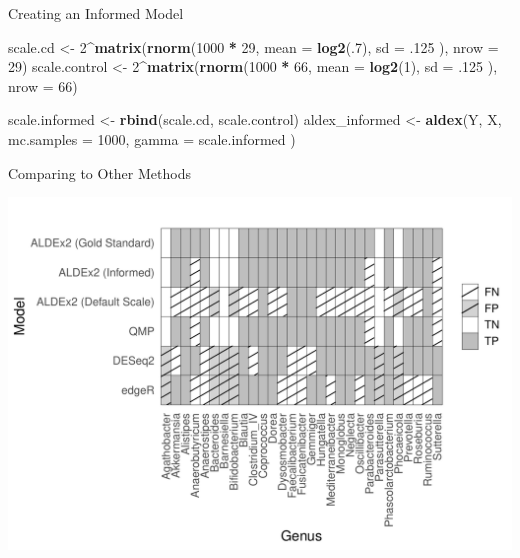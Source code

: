 \documentclass[
  ignorenonframetext,
]{beamer}
\newenvironment{Shaded}{\begin{snugshade}}{\end{snugshade}}
\newcommand{\AttributeTok}[1]{\textcolor[rgb]{0.13,0.29,0.53}{#1}}
\newcommand{\DecValTok}[1]{\textcolor[rgb]{0.00,0.00,0.81}{#1}}
\newcommand{\FunctionTok}[1]{\textcolor[rgb]{0.13,0.29,0.53}{\textbf{#1}}}
\newcommand{\NormalTok}[1]{#1}
\newcommand{\OtherTok}[1]{\textcolor[rgb]{0.56,0.35,0.01}{#1}}
\newcommand{\SpecialCharTok}[1]{\textcolor[rgb]{0.81,0.36,0.00}{\textbf{#1}}}
\begin{document}
\begin{frame}[fragile]{Creating an Informed Model}
\protect\hypertarget{creating-an-informed-model}{}
\begin{Shaded}
\begin{Highlighting}[]
\NormalTok{scale.cd }\OtherTok{\textless{}{-}} \DecValTok{2}\SpecialCharTok{\^{}}\FunctionTok{matrix}\NormalTok{(}\FunctionTok{rnorm}\NormalTok{(}\DecValTok{1000} \SpecialCharTok{*} \DecValTok{29}\NormalTok{,}
  \AttributeTok{mean =} \FunctionTok{log2}\NormalTok{(.}\DecValTok{7}\NormalTok{), }\AttributeTok{sd =}\NormalTok{ .}\DecValTok{125}
\NormalTok{), }\AttributeTok{nrow =} \DecValTok{29}\NormalTok{)}
\NormalTok{scale.control }\OtherTok{\textless{}{-}} \DecValTok{2}\SpecialCharTok{\^{}}\FunctionTok{matrix}\NormalTok{(}\FunctionTok{rnorm}\NormalTok{(}\DecValTok{1000} \SpecialCharTok{*} \DecValTok{66}\NormalTok{,}
  \AttributeTok{mean =} \FunctionTok{log2}\NormalTok{(}\DecValTok{1}\NormalTok{), }\AttributeTok{sd =}\NormalTok{ .}\DecValTok{125}
\NormalTok{), }\AttributeTok{nrow =} \DecValTok{66}\NormalTok{)}

\NormalTok{scale.informed }\OtherTok{\textless{}{-}} \FunctionTok{rbind}\NormalTok{(scale.cd, scale.control)}
\NormalTok{aldex\_informed }\OtherTok{\textless{}{-}} \FunctionTok{aldex}\NormalTok{(Y, X,}
  \AttributeTok{mc.samples =} \DecValTok{1000}\NormalTok{,}
  \AttributeTok{gamma =}\NormalTok{ scale.informed}
\NormalTok{)}
\end{Highlighting}
\end{Shaded}
\end{frame}

\begin{frame}{Comparing to Other Methods}
\protect\hypertarget{comparing-to-other-methods}{}
\begin{center}\includegraphics[width=0.95\linewidth]{slides_files/figure-beamer/unnamed-chunk-19-1} \end{center}
\end{frame}
\end{document}
